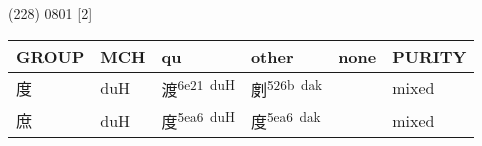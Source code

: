\documentclass[14pt,a4paper]{scrartcl}
\begin{document}
(228) 0801 {[}2{]}

\begin{longtable}[c]{@{}llllll@{}}
\toprule
\begin{minipage}[b]{0.14\columnwidth}\raggedright\strut
GROUP
\strut\end{minipage} &
\begin{minipage}[b]{0.14\columnwidth}\raggedright\strut
MCH
\strut\end{minipage} &
\begin{minipage}[b]{0.14\columnwidth}\raggedright\strut
qu
\strut\end{minipage} &
\begin{minipage}[b]{0.14\columnwidth}\raggedright\strut
other
\strut\end{minipage} &
\begin{minipage}[b]{0.14\columnwidth}\raggedright\strut
none
\strut\end{minipage} &
\begin{minipage}[b]{0.14\columnwidth}\raggedright\strut
PURITY
\strut\end{minipage}\tabularnewline
\midrule
\endhead
\begin{minipage}[t]{0.14\columnwidth}\raggedright\strut
度
\strut\end{minipage} &
\begin{minipage}[t]{0.14\columnwidth}\raggedright\strut
duH
\strut\end{minipage} &
\begin{minipage}[t]{0.14\columnwidth}\raggedright\strut
渡\textsuperscript{6e21~duH}
\strut\end{minipage} &
\begin{minipage}[t]{0.14\columnwidth}\raggedright\strut
剫\textsuperscript{526b~dak}
\strut\end{minipage} &
\begin{minipage}[t]{0.14\columnwidth}\raggedright\strut
\strut\end{minipage} &
\begin{minipage}[t]{0.14\columnwidth}\raggedright\strut
mixed
\strut\end{minipage}\tabularnewline
\begin{minipage}[t]{0.14\columnwidth}\raggedright\strut
庶
\strut\end{minipage} &
\begin{minipage}[t]{0.14\columnwidth}\raggedright\strut
duH
\strut\end{minipage} &
\begin{minipage}[t]{0.14\columnwidth}\raggedright\strut
度\textsuperscript{5ea6~duH}
\strut\end{minipage} &
\begin{minipage}[t]{0.14\columnwidth}\raggedright\strut
度\textsuperscript{5ea6~dak}
\strut\end{minipage} &
\begin{minipage}[t]{0.14\columnwidth}\raggedright\strut
\strut\end{minipage} &
\begin{minipage}[t]{0.14\columnwidth}\raggedright\strut
mixed
\strut\end{minipage}\tabularnewline
\bottomrule
\end{longtable}
\end{document}
